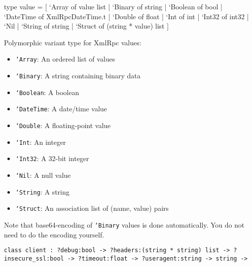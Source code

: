 \documentclass[11pt]{article}
\begin{document}
\label{type:XmlRpc.value}\begin{ocamldoccode}
type value = [ `Array of value list
  | `Binary of string
  | `Boolean of bool
  | `DateTime of XmlRpcDateTime.t
  | `Double of float
  | `Int of int
  | `Int32 of int32
  | `Nil
  | `String of string
  | `Struct of (string * value) list ] 
\end{ocamldoccode}
\begin{ocamldocdescription}
Polymorphic variant type for XmlRpc values:\begin{itemize}
\item {\tt{`Array}}: An ordered list of values
\item {\tt{`Binary}}: A string containing binary data
\item {\tt{`Boolean}}: A boolean
\item {\tt{`DateTime}}: A date/time value
\item {\tt{`Double}}: A floating-point value
\item {\tt{`Int}}: An integer
\item {\tt{`Int32}}: A 32-bit integer
\item {\tt{`Nil}}: A null value
\item {\tt{`String}}: A string
\item {\tt{`Struct}}: An association list of (name, value) pairs
\end{itemize}

    Note that base64-encoding of {\tt{`Binary}} values is done automatically.
    You do not need to do the encoding yourself.


\end{ocamldocdescription}




\begin{ocamldoccode}
{\tt{class client : }}{\tt{?debug:bool -> ?headers:(string * string) list -> ?insecure\_ssl:bool -> ?timeout:float -> ?useragent:string -> string -> }}\end{ocamldoccode}
\label{class:XmlRpc.client}
\end{document}
